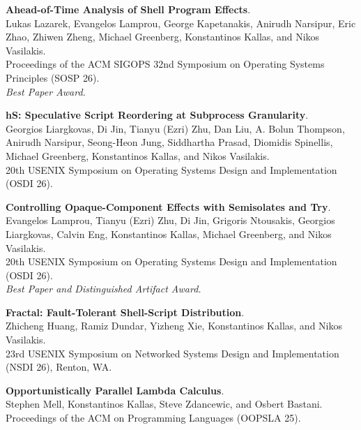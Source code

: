 \begin{minipage}{\textwidth}
\textbf{Ahead-of-Time Analysis of Shell Program Effects}. \\
Lukas Lazarek, Evangelos Lamprou, George Kapetanakis, Anirudh Narsipur, Eric Zhao, Zhiwen Zheng, Michael Greenberg, Konstantinos Kallas, and Nikos Vasilakis. \\
Proceedings of the ACM SIGOPS 32nd Symposium on Operating Systems Principles (SOSP 26).\\
 \emph{Best Paper Award.}
\end{minipage}

\begin{minipage}{\textwidth}
\textbf{hS: Speculative Script Reordering at Subprocess Granularity}. \\
Georgios Liargkovas, Di Jin, Tianyu (Ezri) Zhu, Dan Liu, A. Bolun Thompson, Anirudh Narsipur, Seong-Heon Jung, Siddhartha Prasad, Diomidis Spinellis, Michael Greenberg, Konstantinos Kallas, and Nikos Vasilakis. \\
20th USENIX Symposium on Operating Systems Design and Implementation (OSDI 26).
\end{minipage}

\begin{minipage}{\textwidth}
\textbf{Controlling Opaque-Component Effects with Semisolates and Try}. \\
Evangelos Lamprou, Tianyu (Ezri) Zhu, Di Jin, Grigoris Ntousakis, Georgios Liargkovas, Calvin Eng, Konstantinos Kallas, Michael Greenberg, and Nikos Vasilakis. \\
20th USENIX Symposium on Operating Systems Design and Implementation (OSDI 26).\\
 \emph{Best Paper and Distinguished Artifact Award.}
\end{minipage}

\begin{minipage}{\textwidth}
\textbf{Fractal: Fault-Tolerant Shell-Script Distribution}. \\
Zhicheng Huang, Ramiz Dundar, Yizheng Xie, Konstantinos Kallas, and Nikos Vasilakis. \\
23rd USENIX Symposium on Networked Systems Design and Implementation (NSDI 26), Renton, WA.
\end{minipage}

\begin{minipage}{\textwidth}
\textbf{Opportunistically Parallel Lambda Calculus}. \\
Stephen Mell, Konstantinos Kallas, Steve Zdancewic, and Osbert Bastani. \\
Proceedings of the ACM on Programming Languages (OOPSLA 25).
\end{minipage}


